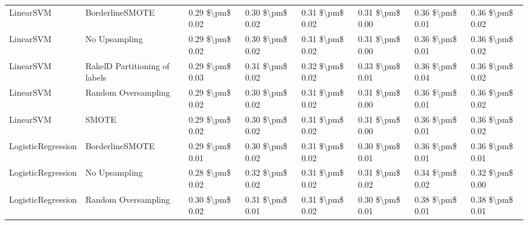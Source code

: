 \begin{tabular}{llllllll}
                      LinearSVM &               BorderlineSMOTE & 0.29 \$\textbackslash pm\$ 0.02 &           0.30 \$\textbackslash pm\$ 0.02 &       0.31 \$\textbackslash pm\$ 0.02 &        0.31 \$\textbackslash pm\$ 0.00 &                         0.36 \$\textbackslash pm\$ 0.01 &     0.36 \$\textbackslash pm\$ 0.02 \\
                      LinearSVM &                 No Upsampling & 0.29 \$\textbackslash pm\$ 0.02 &           0.30 \$\textbackslash pm\$ 0.02 &       0.31 \$\textbackslash pm\$ 0.02 &        0.31 \$\textbackslash pm\$ 0.00 &                         0.36 \$\textbackslash pm\$ 0.01 &     0.36 \$\textbackslash pm\$ 0.02 \\
                      LinearSVM & RakelD Partitioning of labels & 0.29 \$\textbackslash pm\$ 0.03 &           0.31 \$\textbackslash pm\$ 0.02 &       0.32 \$\textbackslash pm\$ 0.02 &        0.33 \$\textbackslash pm\$ 0.01 &                         0.36 \$\textbackslash pm\$ 0.04 &     0.36 \$\textbackslash pm\$ 0.02 \\
                      LinearSVM &           Random Oversampling & 0.29 \$\textbackslash pm\$ 0.02 &           0.30 \$\textbackslash pm\$ 0.02 &       0.31 \$\textbackslash pm\$ 0.02 &        0.31 \$\textbackslash pm\$ 0.00 &                         0.36 \$\textbackslash pm\$ 0.01 &     0.36 \$\textbackslash pm\$ 0.02 \\
                      LinearSVM &                         SMOTE & 0.29 \$\textbackslash pm\$ 0.02 &           0.30 \$\textbackslash pm\$ 0.02 &       0.31 \$\textbackslash pm\$ 0.02 &        0.31 \$\textbackslash pm\$ 0.00 &                         0.36 \$\textbackslash pm\$ 0.01 &     0.36 \$\textbackslash pm\$ 0.02 \\
             LogisticRegression &               BorderlineSMOTE & 0.29 \$\textbackslash pm\$ 0.01 &           0.30 \$\textbackslash pm\$ 0.02 &       0.31 \$\textbackslash pm\$ 0.02 &        0.30 \$\textbackslash pm\$ 0.01 &                         0.36 \$\textbackslash pm\$ 0.01 &     0.36 \$\textbackslash pm\$ 0.01 \\
             LogisticRegression &                 No Upsampling & 0.28 \$\textbackslash pm\$ 0.02 &           0.32 \$\textbackslash pm\$ 0.02 &       0.31 \$\textbackslash pm\$ 0.02 &        0.31 \$\textbackslash pm\$ 0.02 &                         0.34 \$\textbackslash pm\$ 0.02 &     0.32 \$\textbackslash pm\$ 0.00 \\
             LogisticRegression &           Random Oversampling & 0.30 \$\textbackslash pm\$ 0.02 &           0.31 \$\textbackslash pm\$ 0.01 &       0.31 \$\textbackslash pm\$ 0.02 &        0.30 \$\textbackslash pm\$ 0.01 &                         0.38 \$\textbackslash pm\$ 0.01 &     0.38 \$\textbackslash pm\$ 0.01 \\

\end{tabular}
